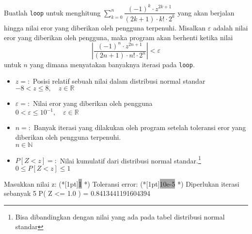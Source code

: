 \documentclass{article}
\newcommand{\enter}{\raisebox{-1.8pt}{\begin{tikzpicture}[scale=0.3]
    \draw[thin,fill=lightgray] (0,0) rectangle (2,1);
    \draw (0.3,0.3) -- (0.7,0.3)--(0.7,0.6);     
\end{tikzpicture}}}
\newcommand{\inputscan}[1]{\raisebox{0pt}[1pt]{\colorbox{darkgray}{#1}}}
\newcommand{\R}{\mathbb{R}}
\newcommand{\N}{\mathbb{N}}
\begin{document}
\begin{enumerate}[label=]
        \begin{hint}
            Buatlah \texttt{loop} untuk menghitung $\displaystyle\sum^n_{k=0}\dfrac{(-1)^k\cdot z^{2k+1}}{(2k+1)\cdot k!\cdot 2^k}$ yang akan berjalan hingga nilai eror yang diberikan oleh pengguna terpenuhi. Misalkan $\varepsilon$ adalah nilai eror yang diberikan oleh pengguna, maka program akan berhenti ketika nilai 
            \[\left|\dfrac{(-1)^n\cdot z^{2n+1}}{(2n+1)\cdot n!\cdot 2^n}\right|<\varepsilon\]
            untuk $n$ yang dimana menyatakan banyaknya iterasi pada \texttt{loop}.
        \end{hint}
        \begin{req}
          \begin{itemize}
            \item $z=:$ Posisi relatif sebuah nilai dalam distribusi normal standar\\
            $-8<z\leq 8,\quad z\in\R$
            \item $\varepsilon=:$ Nilai eror yang diberikan oleh pengguna\\
            $0<\varepsilon\leq 10^{-1},\quad \varepsilon\in\R$
        \end{itemize}
        \end{req}
        \begin{out}
            \begin{itemize}
              \item $n=:$ Banyak iterasi yang dilakukan oleh program setelah toleransi eror yang diberikan oleh pengguna terpenuhi.\\
              $n\in\N$
              \item $P\left[Z<z\right]=:$ Nilai kumulatif dari distribusi normal standar.\footnote{Bisa dibandingkan dengan nilai yang ada pada tabel distribusi normal standar}\\
              $0\leq P\left[Z<z\right]\leq 1$
            \end{itemize}
        \end{out}
        \begin{RunCode}
Masukkan nilai z: (*\inputscan{1} \enter*)
Toleransi error: (*\inputscan{10e-5} \enter*)
Diperlukan iterasi sebanyak 5
P( Z <= 1.0 ) = 0.8413441191604394
        \end{RunCode}
    \end{enumerate}
\end{document}
